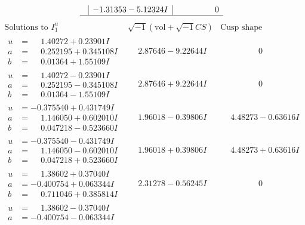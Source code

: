 \documentclass[1p]{elsarticle_modified}
\theoremstyle{definition}
\newcommand{\I}{\sqrt{-1}}
\begin{document}
$$\begin{array}{c|c|c}
 & -1.31353 - 5.12324 I & \phantom{-0.000000 } 0\\
 \hline 
 \end{array}$$\newpage$$\begin{array}{c|c|c}  
\text{Solutions to }I^u_{1}& \I (\text{vol} + \sqrt{-1}CS) & \text{Cusp shape}\\
 \hline 
\begin{aligned}
u &= \phantom{-}1.40272 + 0.23901 I \\
a &= \phantom{-}0.252195 + 0.345108 I \\
b &= \phantom{-}0.01364 + 1.55109 I\end{aligned}
 & \phantom{-}2.87646 - 9.22644 I & \phantom{-0.000000 } 0 \\ \hline\begin{aligned}
u &= \phantom{-}1.40272 - 0.23901 I \\
a &= \phantom{-}0.252195 - 0.345108 I \\
b &= \phantom{-}0.01364 - 1.55109 I\end{aligned}
 & \phantom{-}2.87646 + 9.22644 I & \phantom{-0.000000 } 0 \\ \hline\begin{aligned}
u &= -0.375540 + 0.431749 I \\
a &= \phantom{-}1.146050 + 0.602010 I \\
b &= \phantom{-}0.047218 - 0.523660 I\end{aligned}
 & \phantom{-}1.96018 - 0.39806 I & \phantom{-}4.48273 - 0.63616 I \\ \hline\begin{aligned}
u &= -0.375540 - 0.431749 I \\
a &= \phantom{-}1.146050 - 0.602010 I \\
b &= \phantom{-}0.047218 + 0.523660 I\end{aligned}
 & \phantom{-}1.96018 + 0.39806 I & \phantom{-}4.48273 + 0.63616 I \\ \hline\begin{aligned}
u &= \phantom{-}1.38602 + 0.37040 I \\
a &= -0.400754 + 0.063344 I \\
b &= \phantom{-}0.711046 + 0.385814 I\end{aligned}
 & \phantom{-}2.31278 - 0.56245 I & \phantom{-0.000000 } 0 \\ \hline\begin{aligned}
u &= \phantom{-}1.38602 - 0.37040 I \\
a &= -0.400754 - 0.063344 I \\

\end{aligned}
\end{array}$$
\end{document}
